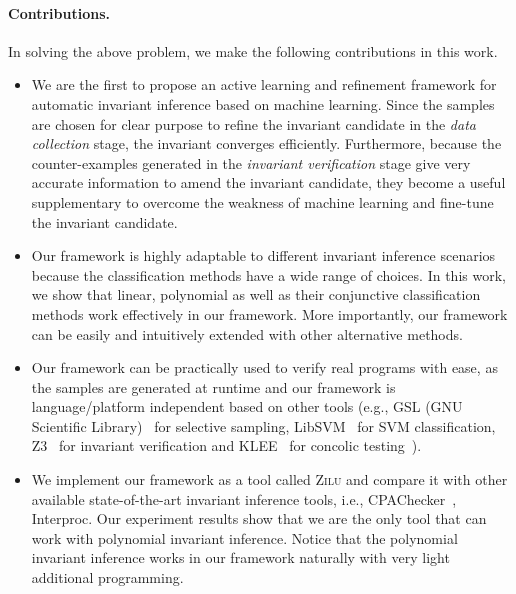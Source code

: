 \paragraph{Contributions.} In solving the above problem, we make the following contributions in this work.
\begin{itemize}
    \item
    We are the first to propose an active learning and refinement framework
    for automatic invariant inference based on machine learning.
    Since the samples are chosen for clear purpose
    to refine the invariant candidate in the \emph{data collection} stage,
    the invariant converges efficiently.
    Furthermore, because the counter-examples generated in the \emph{invariant verification} stage
    give very accurate information to amend the invariant candidate,
    they become a useful supplementary to overcome the weakness of machine learning
    and fine-tune the invariant candidate.
    \item
    Our framework is highly adaptable to different invariant inference scenarios
    because the classification methods have a wide range of choices.
    In this work, we show that linear, polynomial as well as
    their conjunctive classification methods work effectively in our framework.
    More importantly, our framework can be easily and intuitively extended with other alternative methods.
    \item
    Our framework can be practically used to verify real programs with ease,
    as the samples are generated at runtime
    and our framework is language/platform independent based on other tools
    (e.g., GSL (GNU Scientific Library)~\cite{gough2009gnu} for selective sampling,
    LibSVM~\cite{chang2011libsvm} for SVM classification,
    Z3~\cite{de2008z3} for invariant verification
    and KLEE~\cite{cadar2008klee} for concolic testing~\cite{sen2007concolic}).
    \item
    We implement our framework as a tool called \textsc{Zilu}
    and compare it with other available state-of-the-art invariant inference tools,
    i.e., CPAChecker~\cite{beyer2011cpachecker}, Interproc.
    Our experiment results show that
    we are the only tool that can work with polynomial invariant inference.
    Notice that the polynomial invariant inference works in our framework
    naturally with very light additional programming.
\end{itemize}


